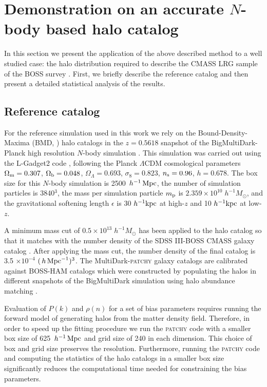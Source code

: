 \documentclass[english,usenatbib]{mn2e}
\newcommand{\mperh}{\,h^{-1}\,{\rm Mpc}}
\newcommand{\hperm}{\,h\,{\rm Mpc}^{-1}}
\begin{document}
\section{Demonstration on an accurate $N$-body based halo catalog}
\label{sec:test}

In this section we present the application of the above described method to a well studied case: the halo distribution required to describe the CMASS LRG sample of the BOSS survey \citep{white2011,Dawson2013}.
First, we briefly describe the reference catalog and then present a detailed statistical analysis of the results.

\subsection{Reference catalog}
\label{sec:reference}

For the reference simulation used in this work we rely on the Bound-Density-Maxima (BMD, \citealt{bdm}) halo catalogs in the $z=0.5618$ snapshot of the BigMultiDark-Planck high 
resolution $N$-body simulation \citep{multidark}. This simulation was carried out using the L-Gadget2 code \citep{gadget}, following the Planck $\Lambda$CDM cosmological parameters 
$\Omega_{\rm m} = 0.307$, $\Omega_{\rm b} = 0.048$, $\Omega_{\Lambda} = 0.693$, $\sigma_{8} = 0.823$, $n_{\rm s}=0.96$, 
$h=0.678$. The box size for this $N$-body simulation is 2500 $\mperh$, the number of simulation particles is 3840$^3$, 
the mass per simulation particle $m_{\rm p}$ is $2.359 \times 10^{10} \; h^{-1} M_{\odot}$, and the gravitational softening length 
$\epsilon$ is 30 $h^{-1} \rm{kpc}$ at high-$z$ and 10 $h^{-1} \rm{kpc}$ at low-$z$.

A minimum mass cut of $0.5 \times 10^{13} \; h^{-1} M_{\odot}$ has been applied to the halo catalog so that it matches with the number density of the SDSS III-BOSS CMASS galaxy catalog \citep{white2011,Dawson2013}. After applying the mass cut, the number density of the final catalog is 3.5 $\times 10^{-4}$ $(\hperm)^{3}$. The MultiDark-\textsc{patchy} galaxy catalogs \citep{kitaura2016} are calibrated against BOSS-HAM catalogs which were constructed by populating the halos in different snapshots of the BigMultiDark simulation using halo abundance matching \citep{sergio2016}.   

Evaluation of $P(k)$ and $\rho(n)$ for a set of bias parameters requires running the forward model of generating halos from the matter density field. Therefore, in order to speed up the fitting procedure we run the \textsc{patchy} code with a smaller box size of 625 $\mperh$ and grid size of 240 in each dimension. This choice of box and grid size preserves the resolution. Furthermore, running the \textsc{patchy} code and computing the statistics of the halo catalogs in a smaller box size significantly reduces the computational time needed for constraining the bias parameters.
\end{document}
